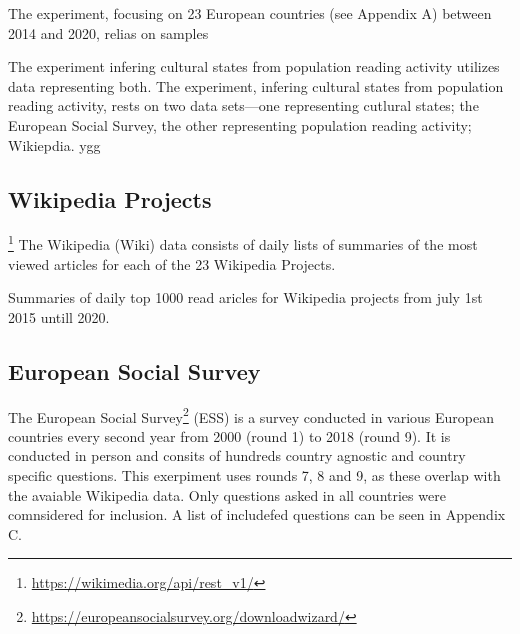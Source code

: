The experiment, focusing on 23 European countries (see Appendix A) between 2014 and 2020, relias on samples


The experiment infering cultural states from population reading activity utilizes data representing both. The experiment, infering cultural states from population reading activity, rests on two data sets—one representing cutlural states; the European Social Survey, the other representing population reading activity; Wikiepdia.
ygg

\subsection*{Wikipedia Projects}

\footnote{\url{https://wikimedia.org/api/rest_v1/}}
The Wikipedia (Wiki) data consists of daily lists of summaries of the most viewed articles for each of the 23 Wikipedia Projects.




Summaries of daily top 1000 read aricles for Wikipedia projects from july 1st 2015 untill 2020.

\subsection*{European Social Survey}

The European Social Survey\footnote{\url{https://europeansocialsurvey.org/downloadwizard/}} (ESS) is a survey conducted in various European countries every second year from 2000 (round 1) to 2018 (round 9). It is conducted in person and consits of hundreds country agnostic and country specific questions. This exerpiment uses rounds 7, 8 and 9, as these overlap with the avaiable Wikipedia data.
Only questions asked in all countries were comnsidered for inclusion. A list of includefed questions can be seen in Appendix C.

